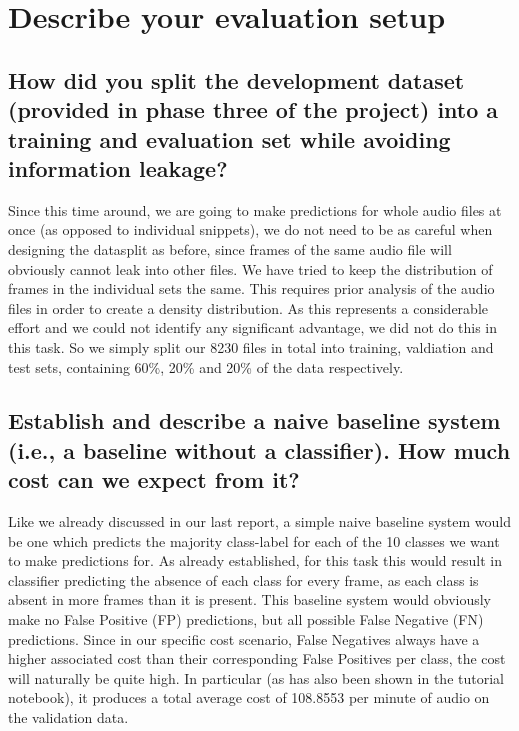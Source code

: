 
\section{Describe your evaluation setup}
\label{sec:Describe your evaluation setup}

\subsection{How did you split the development dataset (provided in phase three of the project) into a training and evaluation set while avoiding information leakage?}
\label{sec:Describe:a}
Since this time around, we are going to make predictions for whole audio files at once (as opposed to individual snippets), we do not need to be as careful when designing the datasplit as before, since frames of the same audio file will obviously cannot leak into other files.
\newline
We have tried to keep the distribution of frames in the individual sets the same. This requires prior analysis of the audio files in order to create a density distribution. As this represents a considerable effort and we could not identify any significant advantage, we did not do this in this task.
\newline
So we simply split our 8230 files in total into training, valdiation and test sets, containing 60\%, 20\% and 20\% of the data respectively.


\subsection{Establish and describe a naive baseline system (i.e., a baseline without a classifier). How much cost can we expect from it?}
\label{sec:Describe:b}
Like we already discussed in our last report, a simple naive baseline system would be one which predicts the majority class-label for each of the 10 classes we want to make predictions for. As already established, for this task this would result in classifier predicting the absence of each class for every frame, as each class is absent in more frames than it is present.
\newline
This baseline system would obviously make no False Positive (FP) predictions, but all possible False Negative (FN) predictions. Since in our specific cost scenario, False Negatives always have a higher associated cost than their corresponding False Positives per class, the cost will naturally be quite high. In particular (as has also been shown in the tutorial notebook), it produces a total average cost of 108.8553 per minute of audio on the validation data. 






